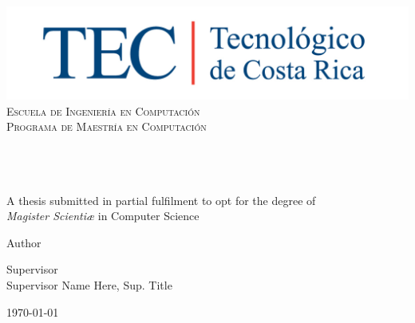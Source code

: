 \begin{titlepage}

\begin{center}

\vfill


\includegraphics[width=1\textwidth]{../images/TECRGB.jpg}
\\[0.2cm]
\textcolor{tecblue}{
\textsc{\LARGE Escuela de Ingeniería en Computación}\\[0.2cm]
\textsc{\large Programa de Maestría en Computación}\\
}
\vfill
 
\HRule
\\[0.9cm]
\doublespacing
{ \huge \bfseries \thesistitle}
\\[0.4cm]
\singlespacing
\HRule
\\[0.9cm]

{\large A thesis submitted in partial fulfilment to opt for the degree of 
\\[1cm]
\textit{Magister Scientiæ} in Computer Science}
\\
\vfill
 
\begin{minipage}{0.45\textwidth}
\begin{flushleft} \large
Author\\
\pdfauthor 
\end{flushleft}
\end{minipage}
\begin{minipage}{0.50\textwidth}
\begin{flushright} \large
Supervisor\\
{Supervisor Name Here, Sup. Title}
\end{flushright}
\end{minipage}
 
 
\vfill
 
{\large \today \\}  \hfill{} 


\end{center}
\end{titlepage}

